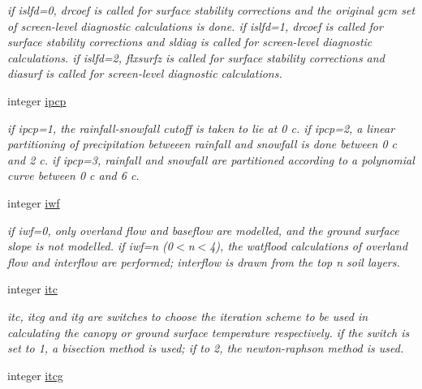 \begin{DoxyCompactItemize}
\begin{DoxyCompactList}\small\item\em if islfd=0, drcoef is called for surface stability corrections and the original gcm set of screen-\/level diagnostic calculations is done. if islfd=1, drcoef is called for surface stability corrections and sldiag is called for screen-\/level diagnostic calculations. if islfd=2, flxsurfz is called for surface stability corrections and diasurf is called for screen-\/level diagnostic calculations. \end{DoxyCompactList}\item 
\hypertarget{structctem__statevars_1_1ctem__switches_a21450d2957b671b4705e6576d0388988}{}integer \hyperlink{structctem__statevars_1_1ctem__switches_a21450d2957b671b4705e6576d0388988}{ipcp}\label{structctem__statevars_1_1ctem__switches_a21450d2957b671b4705e6576d0388988}

\begin{DoxyCompactList}\small\item\em if ipcp=1, the rainfall-\/snowfall cutoff is taken to lie at 0 c. if ipcp=2, a linear partitioning of precipitation betweeen rainfall and snowfall is done between 0 c and 2 c. if ipcp=3, rainfall and snowfall are partitioned according to a polynomial curve between 0 c and 6 c. \end{DoxyCompactList}\item 
\hypertarget{structctem__statevars_1_1ctem__switches_a8152a56134a193df9f102157ae7031cd}{}integer \hyperlink{structctem__statevars_1_1ctem__switches_a8152a56134a193df9f102157ae7031cd}{iwf}\label{structctem__statevars_1_1ctem__switches_a8152a56134a193df9f102157ae7031cd}

\begin{DoxyCompactList}\small\item\em if iwf=0, only overland flow and baseflow are modelled, and the ground surface slope is not modelled. if iwf=n (0$<$n$<$4), the watflood calculations of overland flow and interflow are performed; interflow is drawn from the top n soil layers. \end{DoxyCompactList}\item 
\hypertarget{structctem__statevars_1_1ctem__switches_a513284f2b6ce6fb443c66f200dc5340b}{}integer \hyperlink{structctem__statevars_1_1ctem__switches_a513284f2b6ce6fb443c66f200dc5340b}{itc}\label{structctem__statevars_1_1ctem__switches_a513284f2b6ce6fb443c66f200dc5340b}

\begin{DoxyCompactList}\small\item\em itc, itcg and itg are switches to choose the iteration scheme to be used in calculating the canopy or ground surface temperature respectively. if the switch is set to 1, a bisection method is used; if to 2, the newton-\/raphson method is used. \end{DoxyCompactList}\item 
\hypertarget{structctem__statevars_1_1ctem__switches_acf0d4082aca09f8686e7b637e518ab5a}{}integer \hyperlink{structctem__statevars_1_1ctem__switches_acf0d4082aca09f8686e7b637e518ab5a}{itcg}\label{structctem__statevars_1_1ctem__switches_acf0d4082aca09f8686e7b637e518ab5a}


\end{DoxyCompactItemize}
